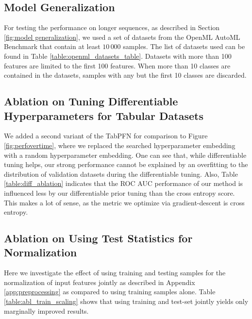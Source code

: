 \documentclass{article}
\begin{document}
\subsection{Model Generalization}\label{app:ssec:abl_generalization}
For testing the \methodname{} performance on longer sequences, as described in Section \ref{fig:model generalization}, we used a set of datasets from the OpenML AutoML Benchmark that contain at least $10\,000$ samples. The list of datasets used can be found in Table \ref{table:openml_datasets_table}. %
Datasets with more than 100 features are limited to the first 100 features. When more than 10 classes are contained in the datasets, samples with any but the first 10 classes are discarded. 
\begin{table}[ht]
    \centering
    \caption{Evaluation datasets for model generalization experiments.}
    \tiny
    
    \label{table:openml_datasets_table}
\end{table}
\subsection{Ablation on Tuning Differentiable Hyperparameters for Tabular Datasets}
\label{app:ssec:abl_diff}
We added a second variant of the TabPFN for comparison to Figure \ref{fig:perfovertime}, where we replaced the searched hyperparameter embedding with a random hyperparameter embedding. One can see that, while differentiable tuning helps, our strong performance cannot be explained by an overfitting to the distribution of validation datasets during the differentiable tuning. Also, Table \ref{table:diff_ablation} indicates that the ROC AUC performance of our method is influenced less by our differentiable prior tuning than the cross entropy score. This makes a lot of sense, as the metric we optimize via gradient-descent is cross entropy. 
\begin{table}[ht]
    \centering
    \caption{A comparison between of \methodname{} with a tuned and a non-tuned hyperparameter embedding.}
    \tiny
    
    \label{table:diff_ablation}
\end{table}
\subsection{Ablation on Using Test Statistics for Normalization} \label{app:abl_train_scaling}
Here we investigate the effect of using training and testing samples for the normalization of input features jointly as described in Appendix \ref{app:preprocessing} as compared to using training samples alone. Table \ref{table:abl_train_scaling} shows that using training and test-set jointly yields only marginally improved results.
\begin{table}[ht]
    \centering
    \caption{A comparison between of \methodname{} using training and testing samples jointly for normalization versus using only training samples.}
    \tiny
    
    \label{table:abl_train_scaling}
\end{table}
\end{document}
